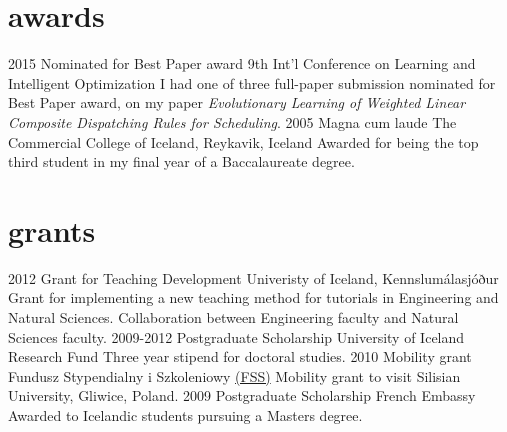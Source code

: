\documentclass[]{cv} %
\begin{document}
\section{awards}

\begin{entrylist}
    \entry
    {2015}
    {Nominated for Best Paper award}
    {9th Int'l Conference on Learning and Intelligent Optimization}
    {I had one of three full-paper submission nominated for Best Paper award, 
    on my 
        paper \emph{Evolutionary Learning of Weighted Linear Composite 
        Dispatching 
            Rules for Scheduling}.}
    \entry
    {2005}
    {Magna cum laude}
    {The Commercial College of Iceland, Reykavik, Iceland}
    {Awarded for being the top third student in my final year of a 
    Baccalaureate degree.}
\end{entrylist}
\clearpage

\section{grants}
\begin{entrylist}
    \entry
    {2012}
    {Grant for Teaching Development}
    {Univeristy of Iceland, Kennslumálasjóður}
    {Grant for implementing a new teaching method for tutorials in Engineering 
    and 
        Natural Sciences. Collaboration between Engineering faculty and Natural 
        Sciences faculty. }
    \entry
    {2009-2012}
    {Postgraduate Scholarship}
    {University of Iceland Research Fund}
    {Three year stipend for doctoral studies.}
    \entry
    {2010}
    {Mobility grant}
    {Fundusz Stypendialny i Szkoleniowy 
    \href{http://www.fss.org.pl/en/about}{(FSS)}} %
    {Mobility grant to visit Silisian University, Gliwice, Poland.}
    \entry
    {2009}
    {Postgraduate Scholarship}
    {French Embassy}
    {Awarded to Icelandic students pursuing a Masters degree.}
\end{entrylist}
\vfill
\end{document}
